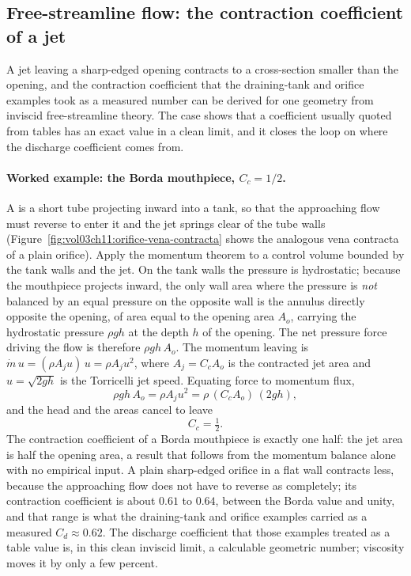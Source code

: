 \subsection{Free-streamline flow: the contraction coefficient of a jet}

A jet leaving a sharp-edged opening contracts to a cross-section
smaller than the opening, and the contraction coefficient that the
draining-tank and orifice examples took as a measured number can be
derived for one geometry from inviscid free-streamline theory. The
case shows that a coefficient usually quoted from tables has an exact
value in a clean limit, and it closes the loop on where the discharge
coefficient comes from.

\paragraph{Worked example: the Borda mouthpiece, $C_c = 1/2$.} A
 is a short tube projecting inward into a
tank, so that the approaching flow must reverse to enter it and the
jet springs clear of the tube walls
(Figure~\ref{fig:vol03ch11:orifice-vena-contracta} shows the analogous
vena contracta of a plain orifice). Apply the momentum theorem to a
control volume bounded by the tank walls and the jet. On the tank
walls the pressure is hydrostatic; because the mouthpiece projects
inward, the only wall area where the pressure is \emph{not} balanced
by an equal pressure on the opposite wall is the annulus directly
opposite the opening, of area equal to the opening area $A_o$, carrying
the hydrostatic pressure $\rho g h$ at the depth $h$ of the opening.
The net pressure force driving the flow is therefore $\rho g h\,A_o$.
The momentum leaving is $\dot m\,u = (\rho A_j u)\,u = \rho A_j u^2$,
where $A_j = C_c A_o$ is the contracted jet area and $u = \sqrt{2gh}$
is the Torricelli jet speed. Equating force to momentum flux,
\[
\rho g h\,A_o = \rho A_j u^2 = \rho\,(C_c A_o)\,(2 g h),
\]
and the head and the areas cancel to leave
\[
C_c = \tfrac12.
\]
The contraction coefficient of a Borda mouthpiece is exactly one half:
the jet area is half the opening area, a result that follows from the
momentum balance alone with no empirical input. A plain sharp-edged
orifice in a flat wall contracts less, because the approaching flow
does not have to reverse as completely; its contraction coefficient is
about $0.61$ to $0.64$, between the Borda value and unity, and that
range is what the draining-tank and orifice examples carried as a
measured $C_d \approx 0.62$. The discharge coefficient that those
examples treated as a table value is, in this clean inviscid limit, a
calculable geometric number; viscosity moves it by only a few percent.

